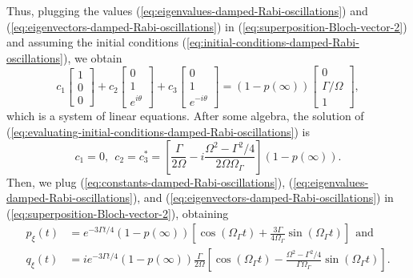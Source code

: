 {\begin{equation}
	\label{eq:initial-conditions-damped-Rabi-oscillations}
\end{equation}
Thus, plugging the values (\ref{eq:eigenvalues-damped-Rabi-oscillations}) and (\ref{eq:eigenvectors-damped-Rabi-oscillations}) in (\ref{eq:superposition-Bloch-vector-2}) and assuming the initial conditions (\ref{eq:initial-conditions-damped-Rabi-oscillations}), we obtain
\begin{equation}
	c_1 \left[ \begin{matrix} 1 \\ 0 \\ 0 \end{matrix} \right] + c_2 \left[ \begin{matrix} 0 \\ 1 \\ e^{i\theta} \end{matrix} \right] + c_3 \left[ \begin{matrix} 0 \\ 1 \\ e^{-i\theta} \end{matrix} \right] = (1 - p(\infty)) \left[ \begin{matrix} 0 \\ \Gamma / \Omega \\ 1 \end{matrix} \right],
	\label{eq:evaluating-initial-conditions-damped-Rabi-oscillations}
\end{equation}
which is a system of linear equations. After some algebra, the solution of (\ref{eq:evaluating-initial-conditions-damped-Rabi-oscillations}) is
\begin{equation}
	c_1 = 0,\ \ c_2 = c_3^* = \left[ \frac{\Gamma}{2\Omega} - i \frac{\Omega^2 - \Gamma^2 / 4}{2 \Omega \Omega_{\Gamma}} \right](1 - p(\infty)).
	\label{eq:constants-damped-Rabi-oscillations}
\end{equation}
Then, we plug (\ref{eq:constants-damped-Rabi-oscillations}), (\ref{eq:eigenvalues-damped-Rabi-oscillations}), and (\ref{eq:eigenvectors-damped-Rabi-oscillations}) in (\ref{eq:superposition-Bloch-vector-2}), obtaining
\begin{align}
	p_{\xi}(t) &= e^{-3\Gamma t / 4}(1 - p(\infty))\left[\cos(\Omega_{\Gamma}t) + \frac{3\Gamma}{4 \Omega_{\Gamma}} \sin(\Omega_{\Gamma}t) \right]\ \ \textrm{and}
	\label{eq:xi-population-inversion-damped-Rabi-oscilations}
	\\
	q_{\xi}(t) &= ie^{-3\Gamma t / 4} (1 - p(\infty)) \frac{\Gamma}{2\Omega} \left[\cos(\Omega_{\Gamma}t) - \frac{\Omega^2 - \Gamma^2 / 4}{\Gamma \Omega_{\Gamma}} \sin(\Omega_{\Gamma}t) \right].

\end{align}}
